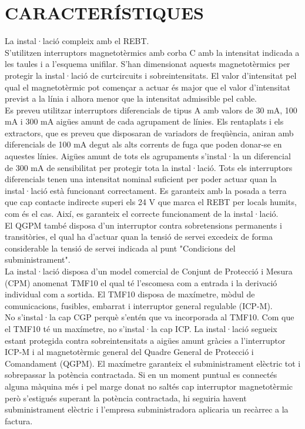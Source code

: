 \chapter{\uppercase{Característiques}}
La instal·lació compleix amb el REBT.\\
\newline S'utilitzen interruptors magnetotèrmics amb corba C amb la intensitat indicada a les taules i a l'esquema unifilar. S'han dimensionat aquests magnetotèrmics per protegir la instal·lació de curtcircuits i sobreintensitats. El valor d'intensitat pel qual el magnetotèrmic pot començar a actuar és major que el valor d'intensitat previst a la línia i alhora menor que la intensitat admissible pel cable.\\
\newline Es preveu utilitzar interruptors diferencials de tipus A amb valors de 30 mA, 100 mA i 300 mA aigües amunt de cada agrupament de línies. Els rentaplats i els extractors, que es preveu que disposaran de variadors de freqüència, aniran amb diferencials de 100 mA degut als alts corrents de fuga que poden donar-se en aquestes línies. Aigües amunt de tots els agrupaments s'instal·la un diferencial de 300 mA de sensibilitat per protegir tota la instal·lació. Tots els interruptors diferencials tenen una intensitat nominal suficient per poder actuar quan la instal·lació està funcionant correctament. Es garanteix amb la posada a terra que cap contacte indirecte superi els 24 V que marca el REBT per locals humits, com és el cas. Així, es garanteix el correcte funcionament de la instal·lació.\\
\newline El QGPM també disposa d'un interruptor contra sobretensions permanents i transitòries, el qual ha d'actuar quan la tensió de servei excedeix de forma considerable la tensió de servei indicada al punt "Condicions del subministrament".\\
\newline La instal·lació disposa d'un model comercial de Conjunt de Protecció i Mesura (CPM) anomenat TMF10 el qual té l'escomesa com a entrada i la derivació individual com a sortida. El TMF10 disposa de maxímetre, mòdul de comunicacions, fusibles, embarrat i interruptor general regulable (ICP-M).\\
\newline No s'instal·la cap CGP perquè s'entén que va incorporada al TMF10. Com que el TMF10 té un maxímetre, no s'instal·la cap ICP. La instal·lació segueix estant protegida contra sobreintensitats a aigües amunt gràcies a l'interruptor ICP-M i al magnetotèrmic general del Quadre General de Protecció i Comandament (QGPM). El maxímetre garanteix el subministrament elèctric tot i sobrepassar la potència contractada. Si en un moment puntual es connectés alguna màquina més i pel marge donat no saltés cap interruptor magnetotèrmic però s'estigués superant la potència contractada, hi seguiria havent subministrament elèctric i l'empresa subministradora aplicaria un recàrrec a la factura.\\
